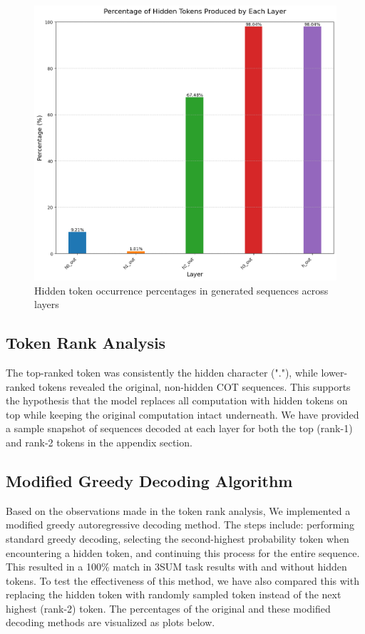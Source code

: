 \documentclass[10pt,a4paper]{article}
\begin{document}
\begin{figure}[H]
\centering
\includegraphics[width=\textwidth]{hidden_tokens_percentage_by_layer.png}
\caption{Hidden token occurrence percentages in generated sequences across layers}
\label{fig:hidden_token_percentages}
\end{figure}


\subsection{Token Rank Analysis}
The top-ranked token was consistently the hidden character ("."), while lower-ranked tokens revealed the original, non-hidden COT sequences. This supports the hypothesis that the model replaces all computation with hidden tokens on top while keeping the original computation intact underneath. We have provided a sample snapshot of sequences decoded at each layer for both the top (rank-1) and rank-2 tokens in the appendix section.

\subsection{Modified Greedy Decoding Algorithm}
Based on the observations made in the token rank analysis, We implemented a modified greedy autoregressive decoding method. The steps include: performing standard greedy decoding, selecting the second-highest probability token when encountering a hidden token, and continuing this process for the entire sequence. This resulted in a 100\% match in 3SUM task results with and without hidden tokens. To test the effectiveness of this method, we have also compared this with replacing the hidden token with randomly sampled token instead of the next highest (rank-2) token. The percentages of the original and these modified decoding methods are visualized as plots below. 
\end{document}
